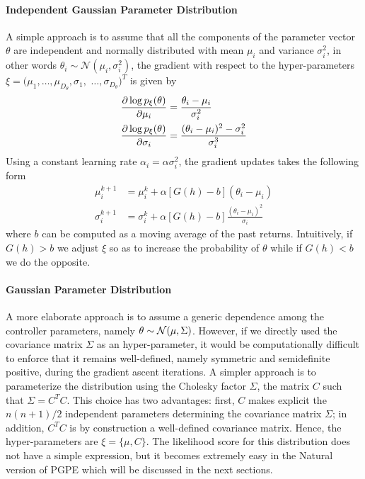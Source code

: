 \paragraph{Independent Gaussian Parameter Distribution}
A simple approach is to assume that all the components of the parameter vector
$\theta$ are independent and normally distributed with mean $\mu_i$ and
variance $\sigma_i^2$, in other words $\theta_i \sim \mathcal{N}(\mu_i, \sigma_i^2)$, the gradient with respect to the hyper-parameters $\xi = (\mu_1, \ldots, \mu_{D_\theta}, \sigma_1,$ $\ldots, \sigma_{D_\theta})^T$ is given by 
\begin{equation}
	\begin{split}
		\frac{\partial \log p_\xi(\theta)}{\partial \mu_i} &= \frac{\theta_i -
		\mu_i}{\sigma_i^2}\\	
		\frac{\partial \log p_\xi(\theta)}{\partial \sigma_i} &= \frac{(\theta_i - \mu_i)^2 -
		\sigma_i^2}{\sigma_i^3}
	\end{split}
\end{equation}
Using a constant learning rate $\alpha_i = \alpha \sigma_i^2$, the gradient
updates takes the following form
\begin{equation}
	\begin{split}
		\mu_i^{k+1} &= \mu_i^k + \alpha \left[G(h) - b\right] (\theta_i - \mu_i)\\
		\sigma_i^{k+1} &= \sigma_i^k + \alpha \left[G(h) - b\right] 
		\frac{(\theta_i -\mu_i)^2}{\sigma_i}
	\end{split}
\end{equation}
where $b$ can be computed as a moving average of the past returns. Intuitively,
if $G(h) > b$ we adjust $\xi$ so as to increase the probability of $\theta$
while if $G(h) < b$ we do the opposite. 

\paragraph{Gaussian Parameter Distribution}
A more elaborate approach is to assume a generic dependence among the controller parameters, namely $\theta \sim \mathcal{N}(\mu, \Sigma)$. However, if we directly used the covariance matrix $\Sigma$ as an hyper-parameter, it would be computationally difficult to enforce that it remains well-defined, namely symmetric and semidefinite positive, during the gradient ascent iterations. A simpler approach is to parameterize the distribution using the Cholesky factor $\Sigma$, the matrix $C$ such that $\Sigma = C^T C$. This choice has two advantages: first, $C$ makes explicit the $n(n+1)/2$ independent parameters determining the covariance matrix $\Sigma$; in addition, $C^T C$ is by construction a well-defined covariance matrix. Hence, the hyper-parameters are $\xi =\{\mu, C\}$. The likelihood score for this distribution does not have a simple expression, but it becomes extremely easy in the Natural version of \gls{PGPE} which will be discussed in the next sections.

